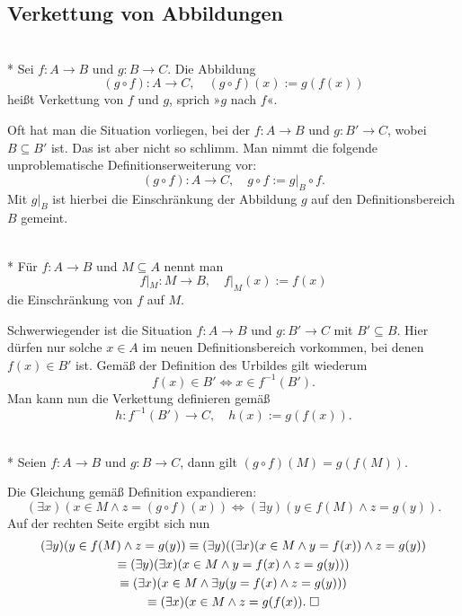 \newpage
\subsection{Verkettung von Abbildungen}
\begin{Definition}[Verkettung]\mbox{}\\*
Sei $f\colon A\to B$ und $g\colon B\to C$. Die Abbildung
\[(g\circ f)\colon A\to C,\quad (g\circ f)(x):=g(f(x))\]
heißt Verkettung von $f$ und $g$, sprich »$g$ nach $f$«.
\end{Definition}

\noindent
Oft hat man die Situation vorliegen, bei der $f\colon A\to B$
und $g\colon B'\to C$, wobei $B\subseteq B'$ ist. Das ist aber
nicht so schlimm. Man nimmt die folgende unproblematische
Definitionserweiterung vor:
\[(g\circ f)\colon A\to C,\quad g\circ f := g|_B\circ f.\]
Mit $g|_B$ ist hierbei die Einschränkung der Abbildung $g$
auf den Definitionsbereich $B$ gemeint.

\begin{Definition}[Einschränkung]\mbox{}\\*
Für $f\colon A\to B$ und $M\subseteq A$ nennt man
\[f|_M\colon M\to B,\quad f|_M(x):=f(x)\]
die Einschränkung von $f$ auf $M$.
\end{Definition}

\noindent
Schwerwiegender ist die Situation $f\colon A\to B$
und $g\colon B'\to C$ mit $B'\subseteq B$. Hier dürfen nur
solche $x\in A$ im neuen Definitionsbereich vorkommen, bei
denen $f(x)\in B'$ ist. Gemäß der Definition des Urbildes
gilt wiederum
\[f(x)\in B'\iff x\in f^{-1}(B').\]
Man kann nun die Verkettung definieren gemäß
\[h\colon f^{-1}(B')\to C,\quad h(x):=g(f(x)).\]

\begin{Satz}\label{img-comp}\mbox{}\\*
Seien $f\colon A\to B$ und $g\colon B\to C$, dann gilt
$(g\circ f)(M) = g(f(M))$.
\end{Satz}
 Die Gleichung gemäß Definition expandieren:
\[(\exists x)(x\in M\land z
= (g\circ f)(x))\iff (\exists y)(y\in f(M)\land z=g(y)).\]
Auf der rechten Seite ergibt sich nun
\begin{gather*}
(\exists y)(y\in f(M)\land z=g(y))
\equiv (\exists y)((\exists x)(x\in M\land y=f(x))\land z=g(y))\\
\equiv (\exists y)(\exists x)(x\in M\land y=f(x)\land z=g(y)))\\
\equiv (\exists x)(x\in M\land\exists y(y=f(x)\land z=g(y)))\\
\equiv (\exists x)(x\in M\land z=g(f(x)).\;\Box
\end{gather*}


